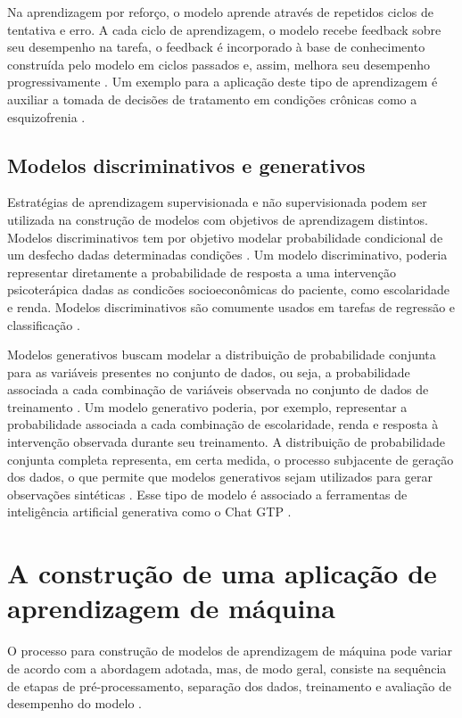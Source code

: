 Na aprendizagem por reforço, o modelo aprende através de repetidos ciclos de tentativa e erro. A cada ciclo de aprendizagem, o modelo recebe feedback sobre seu
desempenho na tarefa, o feedback é incorporado à base de conhecimento construída pelo modelo em ciclos passados e, assim, melhora seu desempenho progressivamente
\cite{Theobald2021, Bi2019}. Um exemplo para a aplicação deste tipo de aprendizagem é auxiliar a tomada de decisões de tratamento em condições crônicas como a
esquizofrenia \cite{Shortreed2010}.

\subsection{Modelos discriminativos e generativos}

Estratégias de aprendizagem supervisionada e não supervisionada podem ser utilizada na construção de modelos com objetivos de aprendizagem distintos. Modelos
discriminativos tem por objetivo modelar probabilidade condicional de um desfecho dadas determinadas condições \cite{Bi2019, Ng2001}. Um modelo discriminativo,
poderia representar diretamente a probabilidade de resposta a uma intervenção psicoterápica dadas as condicões socioeconômicas do paciente, como escolaridade e
renda. Modelos discriminativos são comumente usados em tarefas de regressão e classificação \cite{Bi2019}.

Modelos generativos buscam modelar a distribuição de probabilidade conjunta para as variáveis presentes no conjunto de dados, ou seja, a probabilidade associada
a cada combinação de variáveis observada no conjunto de dados de treinamento \cite{Bi2019, Ng2001}. Um modelo generativo poderia, por exemplo, representar a
probabilidade associada a cada combinação de escolaridade, renda e resposta à intervenção observada durante seu treinamento. A distribuição de probabilidade
conjunta completa representa, em certa medida, o processo subjacente de geração dos dados, o que permite que modelos generativos sejam utilizados para gerar
observações sintéticas \cite{Bi2019}. Esse tipo de modelo é associado a ferramentas de inteligência artificial generativa como o Chat GTP \cite{Wu2023}.

\section{A construção de uma aplicação de aprendizagem de máquina}

O processo para construção de modelos de aprendizagem de máquina pode variar de acordo com a abordagem adotada, mas, de modo geral, consiste na sequência de etapas
de pré-processamento, separação dos dados, treinamento e avaliação de desempenho do modelo \cite{Greener2021}.

